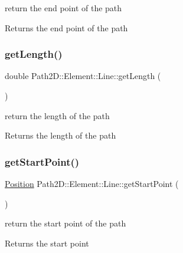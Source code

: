 return the end point of the path 

\begin{DoxyReturn}{Returns}
the end point of the path 
\end{DoxyReturn}
\mbox{\label{class_path2_d_1_1_element_1_1_line_a9f75579914f368af881348c298ecefb1}} 
\subsubsection{\texorpdfstring{get\+Length()}{getLength()}}
{\footnotesize\ttfamily double Path2\+D\+::\+Element\+::\+Line\+::get\+Length (\begin{DoxyParamCaption}{ }\end{DoxyParamCaption})}

return the length of the path \begin{DoxyReturn}{Returns}
the length of the path 
\end{DoxyReturn}
\mbox{\label{class_path2_d_1_1_element_1_1_line_a1170a26baad8c08c33b1eecbb0305810}} 
\subsubsection{\texorpdfstring{get\+Start\+Point()}{getStartPoint()}}
{\footnotesize\ttfamily \mbox{\hyperlink{class_path2_d_1_1_element_1_1_position}{Position}} Path2\+D\+::\+Element\+::\+Line\+::get\+Start\+Point (\begin{DoxyParamCaption}{ }\end{DoxyParamCaption})}



return the start point of the path 

\begin{DoxyReturn}{Returns}
the start point 
\end{DoxyReturn}
\mbox{\label{class_path2_d_1_1_element_1_1_line_acf0f091fc601933343d71f166932e109}} 

